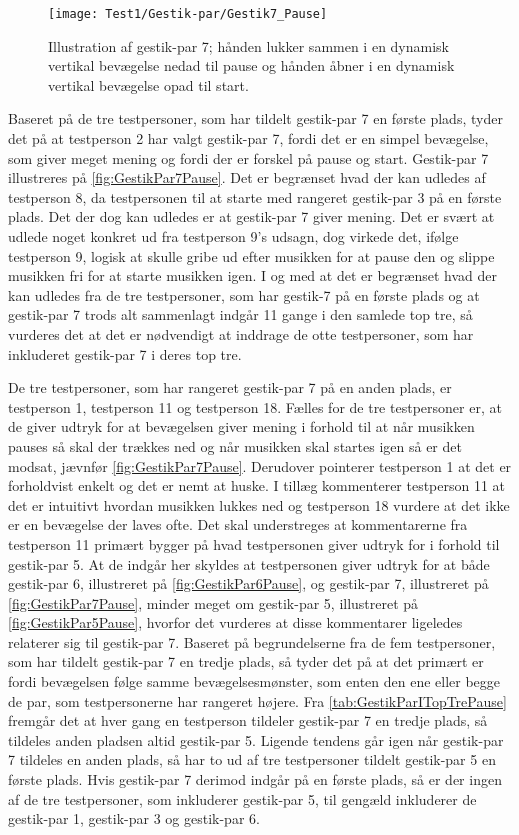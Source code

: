 %
\begin{figure}[H]
	\centering
	\texttt{[image: Test1/Gestik-par/Gestik7\_Pause]}
	\caption{Illustration af gestik-par 7; hånden lukker sammen i en dynamisk vertikal bevægelse nedad til pause og hånden åbner i en dynamisk vertikal bevægelse opad til start.}
	\label{fig:GestikPar7Pause}
\end{figure}
\noindent
%
Baseret på de tre testpersoner, som har tildelt gestik-par 7 en første plads, tyder det på at testperson 2 har valgt gestik-par 7, fordi det er en simpel bevægelse, som giver meget mening og fordi der er forskel på pause og start. Gestik-par 7 illustreres på \autoref{fig:GestikPar7Pause}. Det er begrænset hvad der kan udledes af testperson 8, da testpersonen til at starte med rangeret gestik-par 3 på en første plads. Det der dog kan udledes er at gestik-par 7 giver mening. Det er svært at udlede noget konkret ud fra testperson 9's udsagn, dog virkede det, ifølge testperson 9, logisk at skulle gribe ud efter musikken for at pause den og slippe musikken fri for at starte musikken igen. I og med at det er begrænset hvad der kan udledes fra de tre testpersoner, som har gestik-7 på en første plads og at gestik-par 7 trods alt sammenlagt indgår 11 gange i den samlede top tre, så vurderes det at det er nødvendigt at inddrage de otte testpersoner, som har inkluderet gestik-par 7 i deres top tre. 

De tre testpersoner, som har rangeret gestik-par 7 på en anden plads, er testperson 1, testperson 11 og testperson 18. Fælles for de tre testpersoner er, at de giver udtryk for at bevægelsen giver mening i forhold til at når musikken pauses så skal der trækkes ned og når musikken skal startes igen så er det modsat, jævnfør \autoref{fig:GestikPar7Pause}. Derudover pointerer testperson 1 at det er forholdvist enkelt og det er nemt at huske. I tillæg kommenterer testperson 11 at det er intuitivt hvordan musikken lukkes ned og testperson 18 vurdere at det ikke er en bevægelse der laves ofte. Det skal understreges at kommentarerne fra testperson 11 primært bygger på hvad testpersonen giver udtryk for i forhold til gestik-par 5. At de indgår her skyldes at testpersonen giver udtryk for at både gestik-par 6, illustreret på \autoref{fig:GestikPar6Pause}, og gestik-par 7, illustreret på \autoref{fig:GestikPar7Pause}, minder meget om gestik-par 5, illustreret på \autoref{fig:GestikPar5Pause}, hvorfor det vurderes at disse kommentarer ligeledes relaterer sig til gestik-par 7. Baseret på begrundelserne fra de fem testpersoner, som har tildelt gestik-par 7 en tredje plads, så tyder det på at det primært er fordi bevægelsen følge samme bevægelsesmønster, som enten den ene eller begge de par, som testpersonerne har rangeret højere. Fra \autoref{tab:GestikParITopTrePause} fremgår det at hver gang en testperson tildeler gestik-par 7 en tredje plads, så tildeles anden pladsen altid gestik-par 5. Ligende tendens går igen når gestik-par 7 tildeles en anden plads, så har to ud af tre testpersoner tildelt gestik-par 5 en første plads. Hvis gestik-par 7 derimod indgår på en første plads, så er der ingen af de tre testpersoner, som inkluderer gestik-par 5, til gengæld inkluderer de gestik-par 1, gestik-par 3 og gestik-par 6. 

